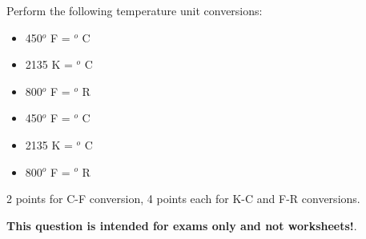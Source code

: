 

Perform the following temperature unit conversions:

\begin{itemize}
\item{} 450$^{o}$ F = \underbar{\hskip 50pt} $^{o}$ C
\vskip 5pt
\item{} 2135 K = \underbar{\hskip 50pt} $^{o}$ C
\vskip 5pt
\item{} 800$^{o}$ F = \underbar{\hskip 50pt} $^{o}$ R
\end{itemize}







\begin{itemize}
\item{} 450$^{o}$ F = $^{o}$ C
\vskip 5pt
\item{} 2135 K = $^{o}$ C
\vskip 5pt
\item{} 800$^{o}$ F = $^{o}$ R
\end{itemize}

2 points for C-F conversion, 4 points each for K-C and F-R conversions.







{\bf This question is intended for exams only and not worksheets!}.




